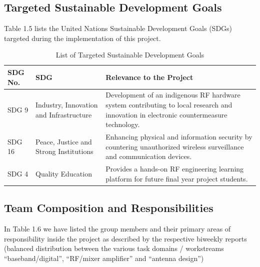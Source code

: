 \documentclass[12pt,a4paper]{report}
\begin{document}
	\subsection{Targeted Sustainable Development Goals}
	Table 1.5 lists the United Nations Sustainable Development Goals (SDGs) targeted during the implementation of this project.
	\begin{table}[htbp]
		\centering
		\caption{List of Targeted Sustainable Development Goals}
		\label{tab:sdg}
		\renewcommand{\arraystretch}{1.3}
		\begin{tabularx}{\textwidth}{|p{2cm}|p{4cm}|X|}
			\hline
			\textbf{SDG No.} & \textbf{SDG} & \textbf{Relevance to the Project} \\
			\hline
			
			SDG 9 &
			Industry, Innovation and Infrastructure &
			Development of an indigenous RF hardware system contributing to local research and innovation in electronic countermeasure technology. \\
			\hline
			
			SDG 16 &
			Peace, Justice and Strong Institutions &
			Enhancing physical and information security by countering unauthorized wireless surveillance and communication devices. \\
			\hline
			
			SDG 4 &
			Quality Education &
			Provides a hands-on RF engineering learning platform for future final year project students. \\
			\hline
			
		\end{tabularx}
	\end{table}
	\subsection{Team Composition and Responsibilities}
	
	In Table 1.6 we have listed the group members and their primary areas of responsibility inside the project as described by the respective biweekly reports (balanced distribution between the various task domains / workstreams “baseband/digital”, “RF/mixer amplifier” and “antenna design”)
	
\end{document}
